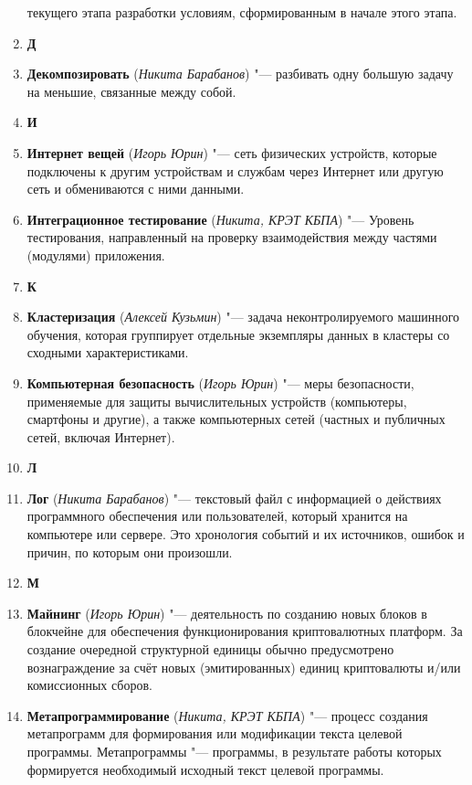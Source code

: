 \documentclass[a4paper, 14 pt]{extarticle}
\begin{document}
\begin{enumerate}
    текущего этапа разработки условиям, сформированным в начале этого этапа.
    \item[] \textbf{Д} 
    \item \textbf{Декомпозировать} (\textit{Никита Барабанов}) "--- разбивать 
    одну большую задачу на меньшие, связанные между собой.
    \item[] \textbf{И} 
    \item \textbf{Интернет вещей} (\textit{Игорь Юрин}) "--- сеть физических 
    устройств, которые подключены к другим устройствам и службам через Интернет 
    или другую сеть и обмениваются с ними данными.
    \item \textbf{Интеграционное тестирование} (\textit{Никита, КРЭТ КБПА}) "---
    Уровень тестирования, направленный на проверку взаимодействия между частями 
    (модулями) приложения. 
    \item[] \textbf{К}
    \item \textbf{Кластеризация} (\textit{Алексей Кузьмин}) "--- 
    задача неконтролируемого машинного обучения, которая группирует отдельные 
    экземпляры данных в кластеры со сходными характеристиками.
    \item \textbf{Компьютерная безопасность} (\textit{Игорь Юрин}) "--- меры 
    безопасности, применяемые для защиты вычислительных устройств (компьютеры, 
    смартфоны и другие), а также компьютерных сетей (частных и публичных сетей, 
    включая Интернет). 
    \item[] \textbf{Л}
    \item \textbf{Лог} (\textit{Никита Барабанов}) "--- текстовый файл с 
    информацией о действиях программного обеспечения или пользователей, который 
    хранится на компьютере или сервере. Это хронология событий и их источников, 
    ошибок и причин, по которым они произошли.
    \item[] \textbf{М}
    \item \textbf{Майнинг} (\textit{Игорь Юрин}) "--- деятельность по созданию 
    новых блоков в блокчейне для обеспечения функционирования криптовалютных 
    платформ. За создание очередной структурной единицы обычно предусмотрено 
    вознаграждение за счёт новых (эмитированных) единиц криптовалюты и/или 
    комиссионных сборов.
    \item \textbf{Метапрограммирование} (\textit{Никита, КРЭТ КБПА}) "--- 
    процесс создания метапрограмм для формирования или модификации текста 
    целевой программы. Метапрограммы "--- программы, в результате работы которых 
    формируется необходимый исходный текст целевой программы.

\end{enumerate}
\end{document}
